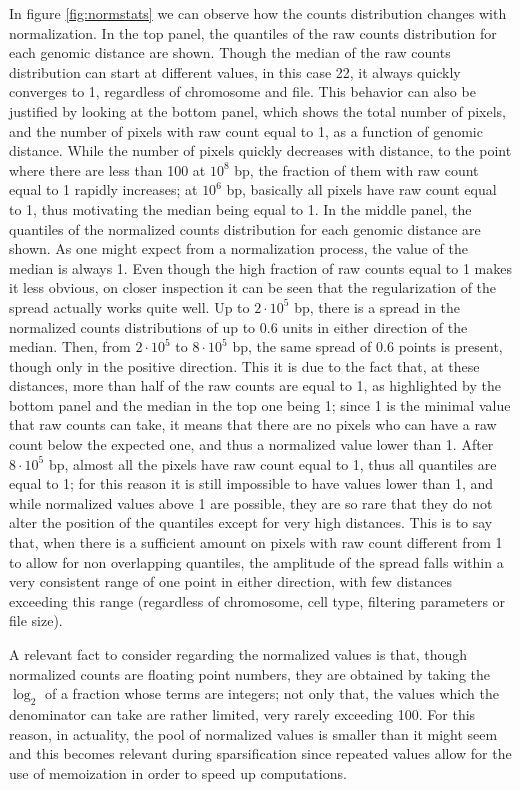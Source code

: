 In figure \ref{fig:normstats} we can observe how the counts distribution changes with normalization. In the top panel, the quantiles of the raw counts distribution for each genomic distance are shown. Though the median of the raw counts distribution can start at different values, in this case 22, it always quickly converges to 1, regardless of chromosome and file. This behavior can also be justified by looking at the bottom panel, which shows the total number of pixels, and the number of pixels with raw count equal to 1, as a function of genomic distance. While the number of pixels quickly decreases with distance, to the point where there are less than 100 at $10^8$ bp, the fraction of them with raw count equal to 1 rapidly increases; at $10^6$ bp, basically all pixels have raw count equal to 1, thus motivating the median being equal to 1. In the middle panel, the quantiles of the normalized counts distribution for each genomic distance are shown. As one might expect from a normalization process, the value of the median is always 1. Even though the high fraction of raw counts equal to 1 makes it less obvious, on closer inspection it can be seen that the regularization of the spread actually works quite well. Up to $2 \cdot 10^5$ bp, there is a spread in the normalized counts distributions of up to $0.6$ units in either direction of the median. Then, from $2 \cdot 10^5$ to $8 \cdot 10^5$ bp, the same spread of $0.6$ points is present, though only in the positive direction. This it is due to the fact that, at these distances, more than half of the raw counts are equal to 1, as highlighted by the bottom panel and the median in the top one being 1; since 1 is the minimal value that raw counts can take, it means that there are no pixels who can have a raw count below the expected one, and thus a normalized value lower than 1. After $8 \cdot 10^5$ bp, almost all the pixels have raw count equal to 1, thus all quantiles are equal to 1; for this reason it is still impossible to have values lower than 1, and while normalized values above 1 are possible, they are so rare that they do not alter the position of the quantiles except for very high distances. This is to say that, when there is a sufficient amount on pixels with raw count different from 1 to allow for non overlapping quantiles, the amplitude of the spread falls within a very consistent range of one point in either direction, with few distances exceeding this range (regardless of chromosome, cell type, filtering parameters or file size). 

A relevant fact to consider regarding the normalized values is that, though normalized counts are floating point numbers, they are obtained by taking the $\log_2$ of a fraction whose terms are integers; not only that, the values which the denominator can take are rather limited, very rarely exceeding 100. For this reason, in actuality, the pool of normalized values is smaller than it might seem and this becomes relevant during sparsification since repeated values allow for the use of memoization in order to speed up computations.

